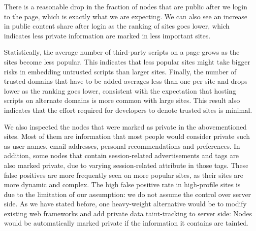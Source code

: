 There is a reasonable drop in the fraction of nodes that are public after we login to the page, which is exactly what we are expecting.  We can also see an increase in public content share after login as the ranking of sites goes lower, which indicates less private information are marked in less important sites.  

Statistically, the average number of third-party scripts on a page grows as the sites become less popular.  This indicates that less popular sites might take bigger risks in embedding untrusted scripts than larger sites.  Finally, the number of trusted domains that have to be added averages less than one per site and drops lower as the ranking goes lower, consistent with the expectation that hosting scripts on alternate domains is more common with large sites.  This result also indicates that the effort required for developers to denote trusted sites is minimal.

We also inspected the nodes that were marked as private in the abovementioned sites.  Most of them are information that most people would consider private such as user names, email addresses, personal recommendations and preferences.  In addition, some nodes that contain session-related advertisements and tags are also marked private, due to varying session-related attribute in those tags.  These false positives are more frequently seen on more popular sites, as their sites are more dynamic and complex.  The high false positive rate in high-profile sites is due to the limitation of our assumption: we do not assume the control over server side.  As we have stated before, one heavy-weight alternative would be to modify existing web frameworks and add private data taint-tracking to server side: Nodes would be automatically marked private if the information it contains are tainted.

